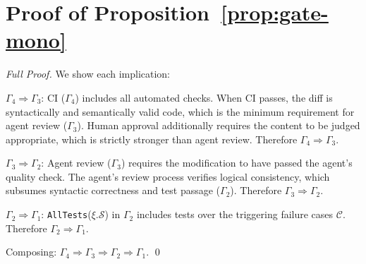 \section{Proof of Proposition~\ref{prop:gate-mono}
}
\label{app:proof-gate}

\begin{proof}[Full Proof]
We show each implication:

$\Gamma_4 \Rightarrow \Gamma_3$: CI ($\Gamma_4$) includes all automated checks.
When CI passes, the diff is syntactically and semantically valid code, which is
the minimum requirement for agent review ($\Gamma_3$). Human approval additionally
requires the content to be judged appropriate, which is strictly stronger than
agent review. Therefore $\Gamma_4 \Rightarrow \Gamma_3$.

$\Gamma_3 \Rightarrow \Gamma_2$: Agent review ($\Gamma_3$) requires the
modification to have passed the agent's quality check. The agent's review
process verifies logical consistency, which subsumes syntactic correctness and
test passage ($\Gamma_2$). Therefore $\Gamma_3 \Rightarrow \Gamma_2$.

$\Gamma_2 \Rightarrow \Gamma_1$: \texttt{AllTests}($\xi.\mathcal{S}$) in
$\Gamma_2$ includes tests over the triggering failure cases $\mathcal{C}$.
Therefore $\Gamma_2 \Rightarrow \Gamma_1$.

Composing: $\Gamma_4 \Rightarrow \Gamma_3 \Rightarrow \Gamma_2 \Rightarrow \Gamma_1$. \qed
\end{proof}

